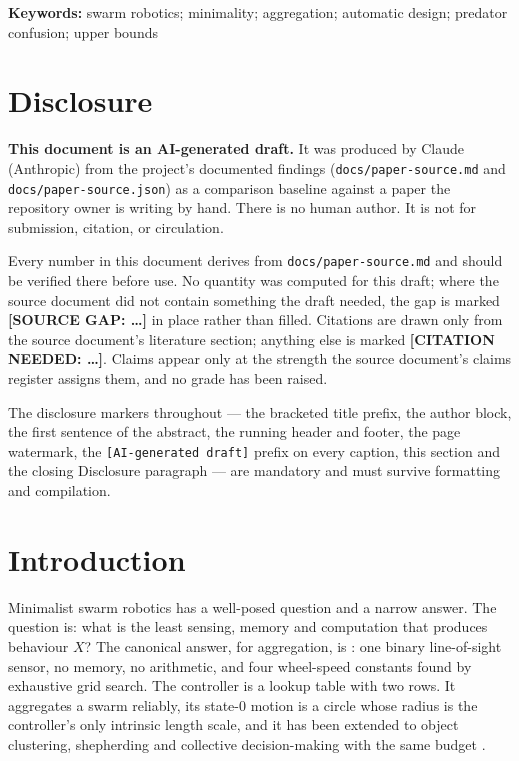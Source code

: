 \documentclass[11pt,a4paper]{article}
\begin{document}
\noindent\textbf{Keywords:} swarm robotics; minimality; aggregation; automatic
design; predator confusion; upper bounds

\section{Disclosure}

\begin{framed}
\noindent\textbf{This document is an AI-generated draft.} It was produced by
Claude (Anthropic) from the project's documented findings
(\texttt{docs/paper-source.md} and \texttt{docs/paper-source.json}) as a
comparison baseline against a paper the repository owner is writing by hand.
There is no human author. It is not for submission, citation, or circulation.

\medskip
\noindent Every number in this document derives from
\texttt{docs/paper-source.md} and should be verified there before use. No
quantity was computed for this draft; where the source document did not contain
something the draft needed, the gap is marked \textbf{[SOURCE GAP: \dots]} in place rather
than filled. Citations are drawn only from the source document's literature
section; anything else is marked \textbf{[CITATION NEEDED: \dots]}. Claims appear
only at the strength the source document's claims register assigns them, and no
grade has
been raised.

\medskip
\noindent The disclosure markers throughout --- the bracketed title prefix, the
author block, the first sentence of the abstract, the running header and footer,
the page watermark, the \texttt{[AI-generated draft]} prefix on every caption,
this section and the closing Disclosure paragraph --- are mandatory and must
survive formatting and compilation.
\end{framed}

\section{Introduction}

Minimalist swarm robotics has a well-posed question and a narrow answer. The
question is: what is the least sensing, memory and computation that produces
behaviour $X$? The canonical answer, for aggregation, is
\citet{gauci2014}: one binary line-of-sight sensor, no memory, no arithmetic,
and four wheel-speed constants found by exhaustive grid search. The controller
is a lookup table with two rows. It aggregates a swarm reliably, its state-0
motion is a circle whose radius is the controller's only intrinsic length scale,
and it has been extended to object clustering, shepherding and collective
decision-making with the same budget \citep{gauci2014aamas, ozdemir2017,
ozdemir2018, johnson2015}.
\end{document}
